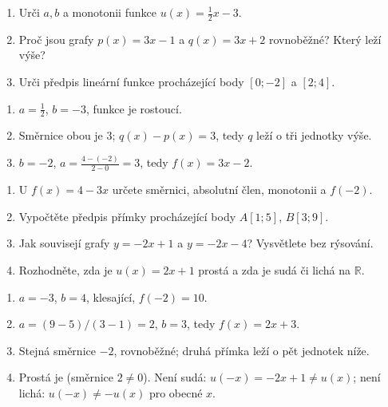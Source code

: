 \documentclass[11pt,a4paper]{article}
\begin{document}
\begin{zadaniReseniBox}[title={Samostatná práce 1}]
\begin{enumerate}[label=\alph*)]
\item Urči $a,b$ a monotonii funkce $u(x)=\tfrac12 x-3$.
\item Proč jsou grafy $p(x)=3x-1$ a $q(x)=3x+2$ rovnoběžné? Který leží výše?
\item Urči předpis lineární funkce procházející body $[0;-2]$ a $[2;4]$.
\end{enumerate}
\tcblower
\begin{enumerate}[label=\alph*)]
\item $a=\frac12$, $b=-3$, funkce je rostoucí.
\item Směrnice obou je $3$; $q(x)-p(x)=3$, tedy $q$ leží o tři jednotky výše.
\item $b=-2$, $a=\frac{4-(-2)}{2-0}=3$, tedy $f(x)=3x-2$.
\end{enumerate}
\end{zadaniReseniBox}

\begin{zadaniReseniBox}[title={Domácí úkol}]
\begin{enumerate}[label=\alph*)]
\item U $f(x)=4-3x$ určete směrnici, absolutní člen, monotonii a $f(-2)$.
\item Vypočtěte předpis přímky procházející body $A[1;5]$, $B[3;9]$.
\item Jak souvisejí grafy $y=-2x+1$ a $y=-2x-4$? Vysvětlete bez rýsování.
\item Rozhodněte, zda je $u(x)=2x+1$ prostá a zda je sudá či lichá na $\mathbb R$.
\end{enumerate}
\tcblower
\begin{enumerate}[label=\alph*)]
\item $a=-3$, $b=4$, klesající, $f(-2)=10$.
\item $a=(9-5)/(3-1)=2$, $b=3$, tedy $f(x)=2x+3$.
\item Stejná směrnice $-2$, rovnoběžné; druhá přímka leží o pět jednotek níže.
\item Prostá je (směrnice $2\ne0$). Není sudá: $u(-x)=-2x+1\ne u(x)$;
není lichá: $u(-x)\ne-u(x)$ pro obecné $x$.
\end{enumerate}
\end{zadaniReseniBox}
\end{document}

